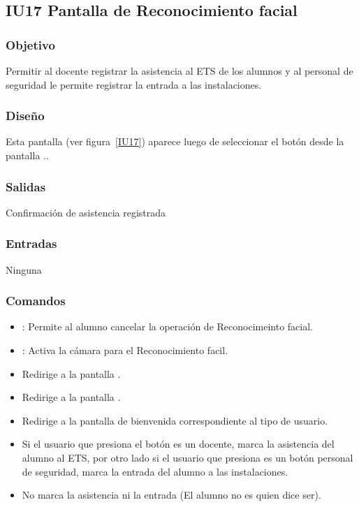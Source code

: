 \subsection{IU17 Pantalla de Reconocimiento facial}

\subsubsection{Objetivo}
Permitir al docente registrar la asistencia al ETS de los alumnos y al personal de seguridad le permite registrar la entrada a las instalaciones.

\subsubsection{Diseño}
Esta pantalla  (ver figura~\ref{IU17}) aparece luego de seleccionar el botón  desde la pantalla ..



\subsubsection{Salidas}
Confirmación de asistencia registrada

\subsubsection{Entradas}
Ninguna

\subsubsection{Comandos}
\begin{itemize}
    \item {}: Permite al alumno cancelar la operación de Reconocimeinto facial.
    \item {}: Activa la cámara para el Reconocimiento facil. 
    \item {} Redirige a la pantalla .
    \item {} Redirige a la pantalla .
    \item {} Redirige a la pantalla de bienvenida correspondiente al tipo de usuario.
    \item {} Si el usuario que presiona el botón es un docente, marca la asistencia del alumno al ETS, por otro lado si el usuario que presiona es un botón personal de seguridad, marca la entrada del alumno a las instalaciones.
    \item {} No marca la asistencia ni la entrada (El alumno no es quien dice ser).
\end{itemize}

